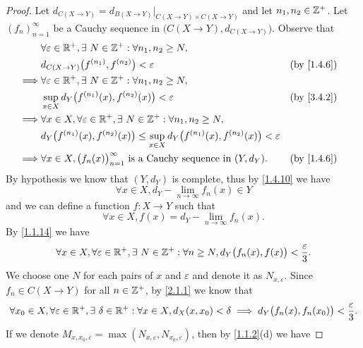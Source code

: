 \begin{proof}
  Let \(d_{C(X \to Y)} = d_{B(X \to Y)}|_{C(X \to Y) \times C(X \to Y)}\) and let \(n_1, n_2 \in \mathbb{Z}^+\).
  Let \((f_n)_{n = 1}^\infty\) be a Cauchy sequence in \(\big(C(X \to Y), d_{C(X \to Y)}\big)\).
  Observe that
  \begin{align*}
             & \forall \varepsilon \in \R^+, \exists\ N \in \Z^+ : \forall n_1, n_2 \geq N,                                                      \\
             & d_{C(X \to Y)}\big(f^{(n_1)}, f^{(n_2)}\big) < \varepsilon                                                        &  & \by{1.4.6} \\
    \implies & \forall \varepsilon \in \R^+, \exists\ N \in \Z^+ : \forall n_1, n_2 \geq N,                                                      \\
             & \sup_{x \in X} d_Y\big(f^{(n_1)}(x), f^{(n_2)}(x)\big) < \varepsilon                                              &  & \by{3.4.2} \\
    \implies & \forall x \in X, \forall \varepsilon \in \R^+, \exists\ N \in \Z^+ : \forall n_1, n_2 \geq N,                                     \\
             & d_Y\big(f^{(n_1)}(x), f^{(n_2)}(x)\big) \leq \sup_{x \in X} d_Y\big(f^{(n_1)}(x), f^{(n_2)}(x)\big) < \varepsilon                 \\
    \implies & \forall x \in X, \big(f_n(x)\big)_{n = 1}^\infty \text{ is a Cauchy sequence in } (Y, d_Y).                       &  & \by{1.4.6}
  \end{align*}
  By hypothesis we know that \((Y, d_Y)\) is complete, thus by \cref{1.4.10} we have
  \[
    \forall x \in X, d_Y - \lim_{n \to \infty} f_n(x) \in Y
  \]
  and we can define a function \(f : X \to Y\) such that
  \[
    \forall x \in X, f(x) = d_Y - \lim_{n \to \infty} f_n(x).
  \]
  By \cref{1.1.14} we have
  \[
    \forall x \in X, \forall \varepsilon \in \mathbb{R}^+, \exists\ N \in \mathbb{Z}^+ : \forall n \geq N, d_Y\big(f_n(x), f(x)\big) < \dfrac{\varepsilon}{3}.
  \]
  We choose one \(N\) for each pairs of \(x\) and \(\varepsilon\) and denote it as \(N_{x, \varepsilon}\).
  Since \(f_n \in C(X \to Y)\) for all \(n \in \mathbb{Z}^+\), by \cref{2.1.1} we know that
  \[
    \forall x_0 \in X, \forall \varepsilon \in \mathbb{R}^+, \exists\ \delta \in \mathbb{R}^+ : \forall x \in X, d_X(x, x_0) < \delta \implies d_Y\big(f_n(x), f_n(x_0)\big) < \dfrac{\varepsilon}{3}.
  \]
  If we denote \(M_{x, x_0, \varepsilon} = \max(N_{x, \varepsilon}, N_{x_0, \varepsilon})\), then by \cref{1.1.2}(d) we have

\end{proof}
